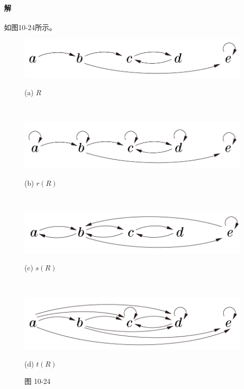 \documentclass[UTF8]{ctexart}
\begin{document}
\paragraph{解}
    如图10-24所示。
    \begin{figure}[!htb]
        \centering
        \begin{minipage}[t]{0.584\textwidth}
        \centering
        \includegraphics[width=1\textwidth]{10-24-o.png}
        \caption*{(a) $R$}
        \end{minipage}
        \\
        \begin{minipage}[t]{0.591\textwidth}
        \centering
        \includegraphics[width=1\textwidth]{10-24-r.png}
        \caption*{(b) $r(R)$}
        \end{minipage}
        \\
        \begin{minipage}[t]{0.581\textwidth}
        \centering
        \includegraphics[width=1\textwidth]{10-24-s.png}
        \caption*{(c) $s(R)$}
        \end{minipage}
        \\
        \begin{minipage}[t]{0.583\textwidth}
        \centering
        \includegraphics[width=1\textwidth]{10-24-t.png}
        \caption*{(d) $t(R)$}
        \end{minipage}
        \caption*{图 10-24}
    \end{figure}
        
\end{document}
